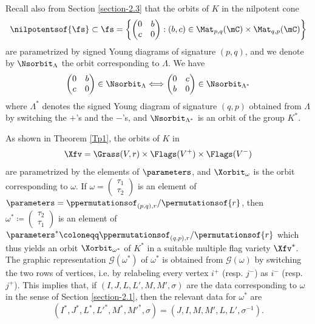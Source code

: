 Recall also from Section \ref{section-2.3} that the orbits of $K$ in the nilpotent cone
\[
\nilpotentsof{\fs}\subset\fs=\left\{\begin{pmatrix} 0 & b\\ c & 0 \end{pmatrix}: (b,c)\in \Mat_{p,q}(\mC)\times\Mat_{q,p}(\mC)\right\}
\]
are parametrized by signed Young diagrams of signature $(p,q)$, and we denote by $\Nsorbit_\Lambda$ the orbit corresponding to $\Lambda$. We have
\begin{equation}
\label{4.6}
\begin{pmatrix} 0 & b\\ c & 0 \end{pmatrix}\in\Nsorbit_\Lambda\Longleftrightarrow \begin{pmatrix} 0 & c\\ b & 0 \end{pmatrix}\in\Nsorbit_{\Lambda^*}
\end{equation}
where $\Lambda^*$ denotes the signed Young diagram of signature $(q,p)$ obtained from $\Lambda$ by switching the $+$'s and the $-$'s, and $\Nsorbit_{\Lambda^*}$ is an orbit of the group $K^*$.

As shown in Theorem \ref{Tp1}, the orbits of $K$ in
\[
\Xfv=\Grass(V,r)\times\Flags(V^+)\times\Flags(V^-)
\]
are parametrized by the elements of $\parameters$, and
$\Xorbit_\omega$ is the orbit corresponding to $\omega$. If
$\omega=\begin{pmatrix} \tau_1\\ \tau_2 \end{pmatrix}$ is an
element of
$\parameters=\ppermutationsof_{(p,q),r}/\permutationsof{r}$, then
$\omega^*\coloneqq \begin{pmatrix} \tau_2\\ \tau_1 \end{pmatrix}$ is an
element of
$\parameters^*\coloneqq \ppermutationsof_{(q,p),r}/\permutationsof{r}$ which
thus yields an orbit $\Xorbit_{\omega^*}$ of $K^*$ in a suitable
multiple flag variety $\Xfv^*$. The graphic representation
$\mathcal{G}(\omega^*)$ of $\omega^*$ is obtained from
$\mathcal{G}(\omega)$ by switching the two rows of vertices, i.e.
by relabeling every vertex $i^+$ (resp. $j^-$) as $i^-$ (resp.
$j^+$). This implies that, if $(I,J,L,L',M,M',\sigma)$ are the data
corresponding to $\omega$ in the sense of Section \ref{section-2.1},
then the relevant data for $\omega^*$ are
\begin{equation}
\label{4.7}
(I^*,J^*,L^*,L'^*,M^*,M'^*,\sigma)=(J,I,M,M',L,L',\sigma^{-1}).
\end{equation}

